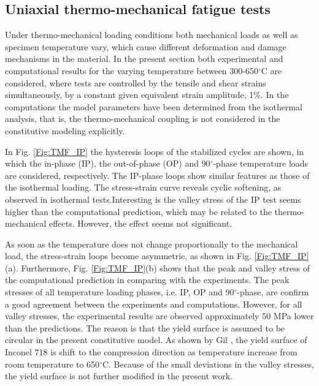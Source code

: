 \documentclass[preprint,5p,twocolumn,11pt,sort&compress]{elsarticle}
\begin{document}
\subsection{Uniaxial thermo-mechanical fatigue tests}
Under thermo-mechanical loading conditions both mechanical loads as well as specimen temperature vary, which cause different deformation and damage mechanisms in the material.
In the present section both experimental and computational results for the varying temperature between 300-650$^{\circ}$C are considered, where tests are controlled by the tensile and shear strains simultaneously, by a constant given equivalent strain amplitude, 1\%. In the computations the model parameters have been determined from the isothermal analysis, that is, the thermo-mechanical coupling is not considered in the constitutive modeling explicitly.

In Fig. \ref{Fig:TMF_IP} the hysteresis loops of the stabilized cycles are shown, in which the in-phase (IP), the out-of-phase (OP) and 90$^\circ$-phase temperature loads are considered, respectively.
The IP-phase loops show similar features as those of the isothermal loading.
The stress-strain curve reveals cyclic softening, as observed in isothermal tests.Interesting is the valley stress of the IP test seems higher than the computational prediction, which may be related to the thermo-mechanical effects. However, the effect seems not significant.

As soon as the temperature does not change proportionally to the mechanical load, the stress-strain loops become asymmetric, as shown in Fig. \ref{Fig:TMF_IP}(a).
Furthermore, Fig. \ref{Fig:TMF_IP}(b) shows that the peak and valley stress of the computational prediction in comparing with the experiments.
The peak stresses of all temperature loading phases, i.e. IP, OP and 90$^\circ$-phase, are confirm a good agreement between the experiments and computations.
However, for all valley stresses, the experimental results are observed approximately 50 MPa lower than the predictions.
The reason is that the yield surface is assumed to be circular in the present constitutive model.
As shown by Gil \cite{Gil1998}, the yield surface of Inconel 718 is shift to the compression direction as temperature increase from room temperature to 650$^{\circ}$C.
Because of the small deviations in the valley stresses, the yield surface is not further modified in the present work.
\end{document}
